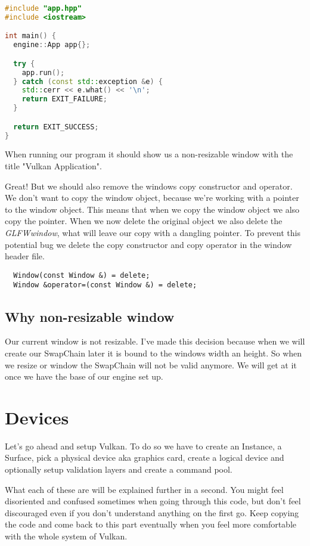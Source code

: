 \documentclass[12pt]{report} \usepackage{preamble}
\begin{document}
\begin{lstlisting}[language=C++]
#include "app.hpp"
#include <iostream>

int main() {
  engine::App app{};

  try {
    app.run();
  } catch (const std::exception &e) {
    std::cerr << e.what() << '\n';
    return EXIT_FAILURE;
  }

  return EXIT_SUCCESS;
}
\end{lstlisting}

When running our program it should show us a non-resizable window with the title "Vulkan Application".

Great! But we should also remove the windows copy constructor and operator. We don't want to copy the window object,
because we're working with a pointer to the window object. This means that when we copy the window object
we also copy the pointer. When we now delete the original object we also delete the \textit{GLFWwindow}, what
will leave our copy with a dangling pointer. To prevent this potential bug we delete
the copy constructor and copy operator in the window header file.

\begin{lstlisting}
  Window(const Window &) = delete;
  Window &operator=(const Window &) = delete;
\end{lstlisting}

\subsection{Why non-resizable window}

Our current window is not resizable. I've made this decision because when we will
create our SwapChain later it is bound to the windows width an height. So when we
resize or window the SwapChain will not be valid anymore. We will get at it once
we have the base of our engine set up.

\section{Devices}

Let's go ahead and setup Vulkan. To do so we have to create an Instance,
a Surface, pick a physical device aka graphics card, create a logical device
and optionally setup validation layers and create a command pool.

What each of these are will be explained further in a second. You might
feel disoriented and confused sometimes when going through this code, but
don't feel discouraged even if you don't understand anything on the first go.
Keep copying the code and come back to this part eventually when you feel more
comfortable with the whole system of Vulkan.
\end{document}
